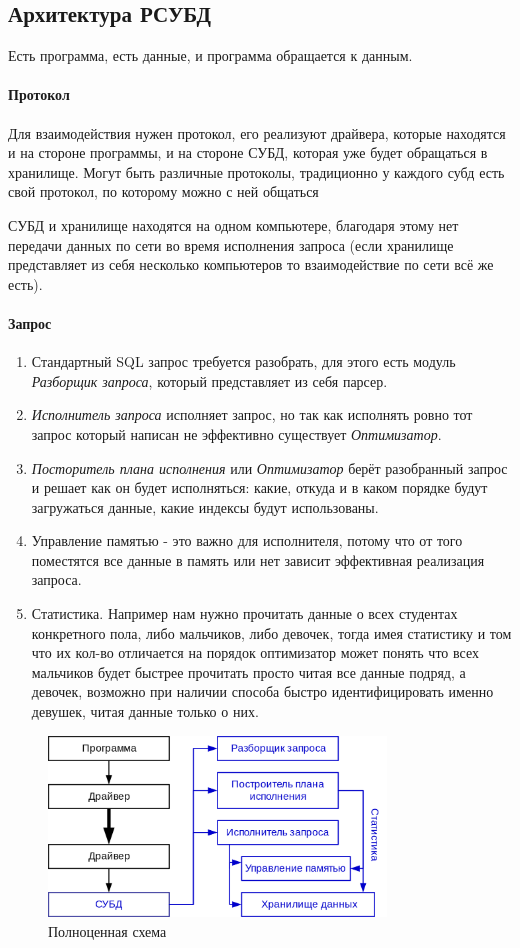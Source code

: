 \subsection{Архитектура РСУБД}

Есть программа, есть данные, и программа обращается к данным.

\paragraph{Протокол} Для взаимодействия нужен протокол, его реализуют драйвера, которые находятся
и на стороне программы, и на стороне СУБД, которая уже будет обращаться в хранилище. Могут быть
различные протоколы, традиционно у каждого субд есть свой протокол, по которому можно с ней
общаться

\begin{remark}
	СУБД и хранилище находятся на одном компьютере, благодаря этому нет передачи данных по сети во
	время исполнения запроса (если хранилище представляет из себя несколько компьютеров то
	взаимодействие по сети всё же есть).
\end{remark}

\paragraph{Запрос}
\begin{enumerate}
	\item Стандартный SQL запрос требуется разобрать, для этого есть модуль \textit{Разборщик запроса}, который
	      представляет из себя парсер.
	\item \textit{Исполнитель запроса} исполняет запрос, но так как исполнять ровно тот запрос
	      который написан не эффективно существует \textit{Оптимизатор}.
	\item \textit{Посторитель плана исполнения} или \textit{Оптимизатор} берёт разобранный
	      запрос и решает как он будет исполняться: какие, откуда и в каком порядке будут загружаться данные,
	      какие индексы будут использованы.
	\item Управление памятью - это важно для исполнителя, потому что от того поместятся все данные в память
	      или нет зависит эффективная реализация запроса.
	\item Статистика. Например нам нужно прочитать данные о всех студентах конкретного пола, либо мальчиков,
	      либо девочек, тогда имея статистику и том что их кол-во отличается на порядок оптимизатор может
	      понять что всех мальчиков будет быстрее прочитать просто читая все данные подряд, а девочек,
	      возможно при наличии способа быстро идентифицировать именно девушек, читая данные только о них.
\end{enumerate}

\begin{figure}[H]
	\centering
	\includegraphics[width=0.8\textwidth]{../assets/kgeorgiy/intro/intro_arch_complete.svg.png}
	\caption{Полноценная схема}
	\label{rsubd-scheme}
\end{figure}
